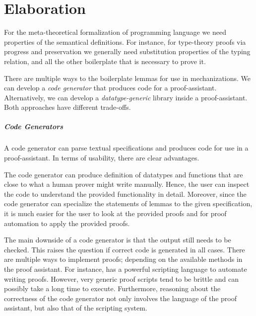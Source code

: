 \chapter{Elaboration}\label{ch:elaboration}
For the meta-theoretical formalization of programming language we need
properties of the semantical definitions. For instance, for type-theory proofs
via progress and preservation we generally need substitution properties of the
typing relation, and all the other boilerplate that is necessary to prove it.

There are multiple ways to the boilerplate lemmas for use in mechanizations. We
can develop a \emph{code generator} that produces code for a proof-assistant.
Alternatively, we can develop a \emph{datatype-generic} library inside a
proof-assistant. Both approaches have different trade-offs.


\paragraph{Code Generators}
A code generator can parse textual \Knot specifications and produces code for
use in a proof-assistant. In terms of usability, there are clear advantages.

The code generator can produce definition of datatypes and functions that are
close to what a human prover might write manually. Hence, the user can inspect
the code to understand the provided functionality in detail. Moreover, since the
code generator can specialize the statements of lemmas to the given
specification, it is much easier for the user to look at the provided proofs
and for proof automation to apply the provided proofs.

The main downside of a code generator is that the output still needs to be
checked. This raises the question if correct code is generated in all cases.
There are multiple ways to implement proofs; depending on the available methods
in the proof assistant. For instance, \Coq has a powerful scripting language to
automate writing proofs. However, very generic proof scripts tend to be brittle
and can possibly take a long time to execute. Furthermore, reasoning about the
correctness of the code generator not only involves the language of the proof
assistant, but also that of the scripting system.


